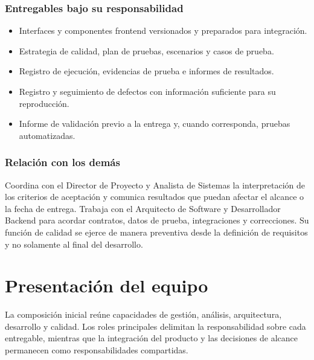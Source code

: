 \subsubsection{Entregables bajo su responsabilidad}
\begin{itemize}
  \item Interfaces y componentes frontend versionados y preparados para integración.
  \item Estrategia de calidad, plan de pruebas, escenarios y casos de prueba.
  \item Registro de ejecución, evidencias de prueba e informes de resultados.
  \item Registro y seguimiento de defectos con información suficiente para su reproducción.
  \item Informe de validación previo a la entrega y, cuando corresponda, pruebas automatizadas.
\end{itemize}

\subsubsection{Relación con los demás}

Coordina con el Director de Proyecto y Analista de Sistemas la interpretación de
los criterios de aceptación y comunica resultados que puedan afectar el alcance o
la fecha de entrega. Trabaja con el Arquitecto de Software y Desarrollador
Backend para acordar contratos, datos de prueba, integraciones y correcciones. Su
función de calidad se ejerce de manera preventiva desde la definición de
requisitos y no solamente al final del desarrollo.

\section{Presentación del equipo}

La composición inicial reúne capacidades de gestión, análisis, arquitectura,
desarrollo y calidad. Los roles principales delimitan la responsabilidad sobre
cada entregable, mientras que la integración del producto y las decisiones de
alcance permanecen como responsabilidades compartidas.

